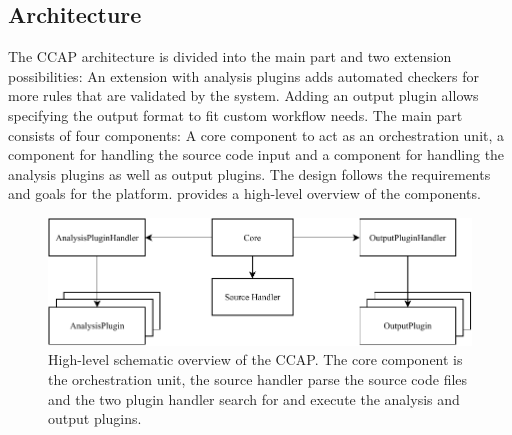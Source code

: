\subsection{Architecture}
The CCAP architecture is divided into the main part and two extension possibilities: An extension with analysis plugins adds automated checkers for more rules that are validated by the system. Adding an output plugin allows specifying the output format to fit custom workflow needs.
The main part consists of four components: A core component to act as an orchestration unit, a component for handling the source code input and a component for handling the analysis plugins as well as output plugins. The design follows the requirements and goals for the platform.  provides a high-level overview of the components.
\begin{figure}
    \includegraphics[width=1\textwidth]{img/CCAP/overview_diagram.pdf}
    \caption[High-level schematic overview of the CCAP.]{High-level schematic overview of the CCAP. The core component is the orchestration unit, the source handler parse the source code files and the two plugin handler search for and execute the analysis and output plugins. }
    \label{fig:overview_ccap}
\end{figure}

